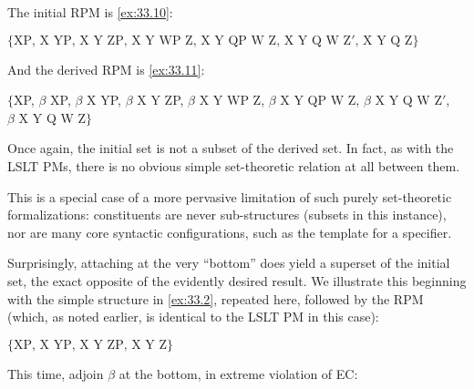 \documentclass[output=paper]{langsci/langscibook}
\begin{document}
\ea\label{ex:33.6}
\z

\noindent The initial \gls{RPM} is \eqref{ex:33.10}:

\ea\label{ex:33.10}$\{\text{XP, X YP, X Y ZP, X Y WP Z, X Y QP W Z, X Y Q W Z$'$, X Y Q Z}\}$
\z

\noindent And the derived \gls{RPM} is \eqref{ex:33.11}:

\ea\label{ex:33.11}$\{$XP, $\beta$ XP, $\beta$ X YP, $\beta$ X Y ZP, $\beta$ X Y WP Z, $\beta$ X Y QP W Z, $\beta$ X Y Q W Z$'$, \\$\beta$ X Y Q W Z$\}$
\z

Once again, the initial set is not a subset of the derived set. In fact, as
with the LSLT \glspl{PM}, there is no obvious simple
set-theoretic relation at all between them.

This is a special case of a more pervasive limitation of such purely
set-theoretic formalizations: constituents are never sub-structures (subsets in
this instance), nor are many core syntactic configurations, such as the
template for a specifier.

Surprisingly, attaching at the very \enquote{bottom} does yield a superset of the
initial set, the exact opposite of the evidently desired result. We illustrate
this beginning with the simple structure in \eqref{ex:33.2}, repeated here, followed by the
\gls{RPM} (which, as noted earlier, is identical to the
LSLT \gls{PM} in this case):

\ea\label{ex:33.12}
\z

\ea\label{ex:33.13}$\{\text{XP, X YP, X Y ZP, X Y Z}\}$
\z

\noindent This time, adjoin $\beta$ at the bottom, in extreme violation of \gls{EC}:

\ea\label{ex:33.14}
\z
\end{document}
